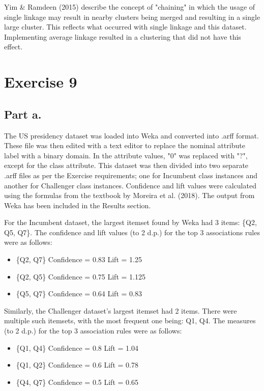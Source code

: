 \documentclass[11pt, a4paper]{article}
\begin{document}
Yim \& Ramdeen (2015) describe the concept of "chaining" in which the usage of single linkage may result in nearby clusters being merged and resulting in a single large cluster. This reflects what occurred with single linkage and this dataset. Implementing average linkage resulted in a clustering that did not have this effect.

\section{Exercise 9}
\subsection{Part a.}

The US presidency dataset was loaded into Weka and converted into .arff format. These file was then edited with a text editor to replace the nominal attribute label with a binary domain. In the attribute values, "0" was replaced with "?", except for the class attribute. This dataset was then divided into two separate .arff files as per the Exercise requirements; one for Incumbent class instances and another for Challenger class instances. Confidence and lift values were calculated using the formulas from the textbook by Moreira et al. (2018). The output from Weka has been included in the Results section.

For the Incumbent dataset, the largest itemset found by Weka had 3 items: \{Q2, Q5, Q7\}. The confidence and lift values (to 2 d.p.) for the top 3 associations rules were as follows:

\begin{itemize}
\item \{Q2, Q7\}
	\subitem Confidence = 0.83
	\subitem Lift = 1.25
\item \{Q2, Q5\}
	\subitem Confidence = 0.75
	\subitem Lift = 1.125
\item \{Q5, Q7\}
	\subitem Confidence = 0.64
	\subitem Lift = 0.83
\end{itemize}

Similarly, the Challenger dataset's largest itemset had 2 items. There were multiple such itemsets, with the most frequent one being: {Q1, Q4}. The measures (to 2 d.p.) for the top 3 association rules were as follows:

\begin{itemize}
\item \{Q1, Q4\}
	\subitem Confidence = 0.8
	\subitem Lift = 1.04
\item \{Q1, Q2\}
	\subitem Confidence = 0.6
	\subitem Lift = 0.78
\item \{Q4, Q7\}
	\subitem Confidence = 0.5
	\subitem Lift = 0.65
\end{itemize}
\end{document}
